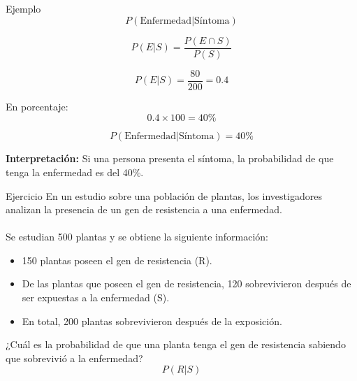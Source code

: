 \documentclass[11pt, aspectratio=169]{beamer}
\begin{document}
\begin{frame}
{Ejemplo}{}
 \centering
 \[
 P(\text{Enfermedad}|\text{Síntoma})
 \]

 \[
 P(E|S)=\frac{P(E \cap S)}{P(S)}
 \]

 \[
 P(E|S)=\frac{80}{200}=0.4
 \]

 En porcentaje:
 \[
 0.4 \times 100 = 40\%
 \]

\end{frame}

\begin{frame}
{}{}
 \centering
 \[
 P(\text{Enfermedad}|\text{Síntoma})=40\%
 \]

 \textbf{Interpretación:} Si una persona presenta el síntoma, la
 probabilidad de que tenga la enfermedad es del 40\%.
\end{frame}

\begin{frame}
{Ejercicio}{}
 \centering
 En un estudio sobre una población de plantas, los investigadores analizan
 la presencia de un gen de resistencia a una enfermedad.\\~\\

 Se estudian 500 plantas y se obtiene la siguiente información:

 \begin{itemize}
 \item 150 plantas poseen el gen de resistencia (R).

 \item De las plantas que poseen el gen de resistencia, 120 sobrevivieron
 después de ser expuestas a la enfermedad (S).

 \item En total, 200 plantas sobrevivieron después de la exposición.
 \end{itemize}

 \vspace{1em}
 ¿Cuál es la probabilidad de que una planta tenga el gen de resistencia
 sabiendo que sobrevivió a la enfermedad?
 \[ P(R|S) \]
\end{frame}
\end{document}
